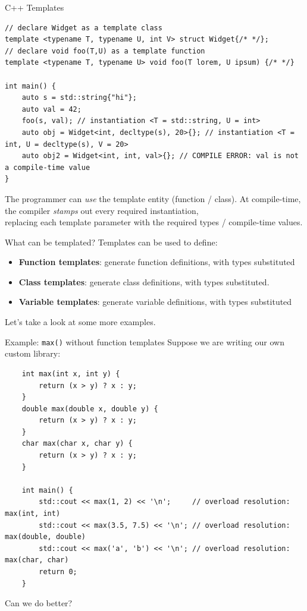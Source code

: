 \begin{frame}[fragile]{C++ Templates}
  \begin{verbatim}
// declare Widget as a template class
template <typename T, typename U, int V> struct Widget{/* */};
// declare void foo(T,U) as a template function
template <typename T, typename U> void foo(T lorem, U ipsum) {/* */}

int main() {
    auto s = std::string{"hi"};
    auto val = 42;
    foo(s, val); // instantiation <T = std::string, U = int>
    auto obj = Widget<int, decltype(s), 20>{}; // instantiation <T = int, U = decltype(s), V = 20>
    auto obj2 = Widget<int, int, val>{}; // COMPILE ERROR: val is not a compile-time value
}
  \end{verbatim}

  \begin{sqt:result}
    The programmer can \emph{use} the template entity (function / class).
    At compile-time, the compiler \emph{stamps} out every required instantiation, \\
    replacing each template parameter with the required types / compile-time values.
  \end{sqt:result}
\end{frame}

\begin{frame}[fragile]{What can be templated?}
  Templates can be used to define:
  \begin{itemize}
    \item \textbf{Function templates}: generate function definitions, with types substituted
    \item \textbf{Class templates}: generate class definitions, with types substituted.
    \item \textbf{Variable templates}: generate variable definitions, with types substituted
  \end{itemize}

  Let's take a look at some more examples.
\end{frame}

\begin{frame}[fragile]{Example: \texttt{max()} without function templates}
  Suppose we are writing our own custom  library:
  \begin{verbatim}
    int max(int x, int y) {
        return (x > y) ? x : y;
    }
    double max(double x, double y) {
        return (x > y) ? x : y;
    }
    char max(char x, char y) {
        return (x > y) ? x : y;
    }

    int main() {
        std::cout << max(1, 2) << '\n';     // overload resolution: max(int, int)
        std::cout << max(3.5, 7.5) << '\n'; // overload resolution: max(double, double)
        std::cout << max('a', 'b') << '\n'; // overload resolution: max(char, char)
        return 0;
    }
  \end{verbatim}

  Can we do better?
\end{frame}

